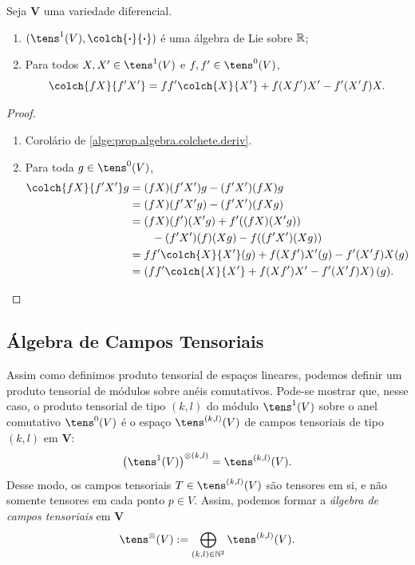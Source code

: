 \begin{prop}
Seja $\bm V$ uma variedade diferencial.
	\begin{enumerate}
	\item $(\tens^1(V),\colch{\var}{\var})$ é uma álgebra de Lie sobre $\mathbb{R}$;
	\item Para todos $X,X' \in \tens^1(V)$ e $f,f' \in \tens^0(V)$,
		\begin{equation*}
		\colch{fX}{f'X'} = ff'\colch{X}{X'} + f(Xf')X' - f'(X'f)X.
		\end{equation*}
	\end{enumerate}
\end{prop}
\begin{proof}
	\begin{enumerate}
	\item Corolário de \ref{alge:prop.algebra.colchete.deriv}.
	\item Para toda $g \in \tens^0(V)$,
		\begin{align*}
		\colch{fX}{f'X'}g &= (fX)(f'X')g - (f'X')(fX)g \\
			&= (fX)(f'X'g) - (f'X')(fXg) \\
			&= (fX)(f')(X'g) + f'((fX)(X'g)) \\
			&\qquad - (f'X')(f)(Xg) - f((f'X')(Xg)) \\
			&= ff'\colch{X}{X'}(g) + f(Xf')X'(g) - f'(X'f)X(g) \\
			&= \left(ff'\colch{X}{X'} + f(Xf')X' - f'(X'f)X\right)(g).
		\end{align*}
	\end{enumerate}
\end{proof}

\subsection{Álgebra de Campos Tensoriais}

Assim como definimos produto tensorial de espaços lineares, podemos definir um produto tensorial de módulos sobre anéis comutativos. Pode-se mostrar que, nesse caso, o produto tensorial de tipo $(k,l)$ do módulo $\tens^1(V)$ sobre o anel comutativo $\tens^0(V)$ é o espaço $\tens^{(k,l)}(V)$ de campos tensoriais de tipo $(k,l)$ em $\bm V$:
	\begin{equation*}
	\left(\tens^1(V)\right)^{\otimes (k,l)} = \tens^{(k,l)}(V).
	\end{equation*}
Desse modo, os campos tensoriais $T \in \tens^{(k,l)}(V)$ são tensores em si, e não somente tensores em cada ponto $p \in V$. Assim, podemos formar a \emph{álgebra de campos tensoriais} em $\bm V$
	\begin{equation*}
	\tens^\otimes (V) := \bigoplus_{(k,l) \in \N^2} \tens^{(k,l)}(V).
	\end{equation*}

